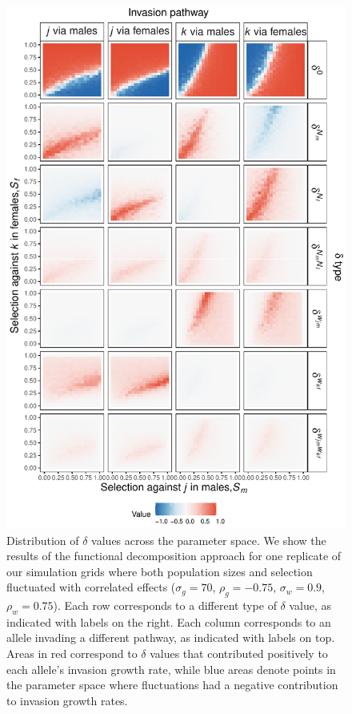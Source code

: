 \begin{refsection}
\begin{figure}[H]
  \centerline{\includegraphics[width=1\textwidth]{figures/chapter4_fig3}}
  \caption[Distribution of $\delta$ values across the parameter space]{Distribution of $\delta$ values across the parameter space. We show the results of the functional decomposition approach for one replicate of our simulation grids where  both population sizes and selection fluctuated with correlated effects  ($\sigma_{g}=70$, $\rho_{g}=-0.75$, $\sigma_{w}=0.9$, $\rho_{w}=0.75$). Each row corresponds to a different type of $\delta$ value, as indicated with labels on the right. Each column corresponds to an allele invading a different pathway, as indicated with labels on top. Areas in red correspond to $\delta$ values that contributed positively to each allele's invasion growth rate, while blue areas denote points in the parameter space where fluctuations had a negative contribution to invasion growth rates.   }
    \label{fig:space}
\end{figure}



\end{refsection}
